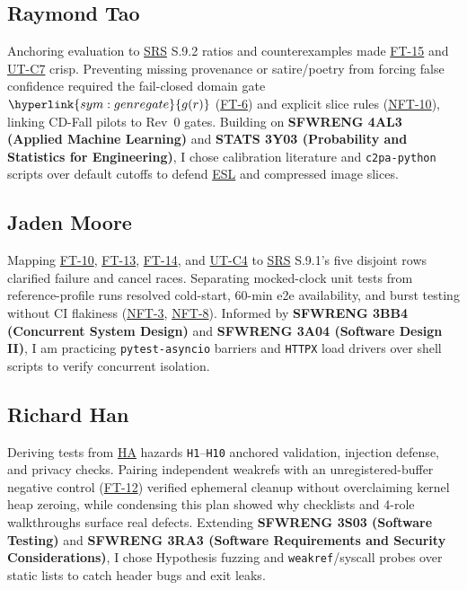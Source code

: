 \documentclass[12pt, titlepage]{article}
\newcommand{\SymGenreGate}{\hyperlink{sym:genregate}{g(r)}}
\newcommand{\ESL}{\hyperlink{vnv-acr-esl}{ESL}}
\newcommand{\HA}{\hyperlink{vnv-acr-ha}{HA}}
\newcommand{\SRS}{\hyperlink{vnv-acr-srs}{SRS}}
\begin{document}
\subsection*{Raymond Tao}
Anchoring evaluation to \SRS{} S.9.2 ratios and counterexamples made \hyperref[test:FT-15]{FT-15} and \hyperref[ut:C7]{UT-C7} crisp. Preventing missing provenance or satire/poetry from forcing false confidence required the fail-closed domain gate $\SymGenreGate$ (\hyperref[test:FT-6]{FT-6}) and explicit slice rules (\hyperref[test:NFT-10]{NFT-10}), linking CD-Fall pilots to Rev~0 gates. Building on \textbf{SFWRENG 4AL3 (Applied Machine Learning)} and \textbf{STATS 3Y03 (Probability and Statistics for Engineering)}, I chose calibration literature and \texttt{c2pa-python} scripts over default cutoffs to defend \ESL{} and compressed image slices.

\subsection*{Jaden Moore}
Mapping \hyperref[test:FT-10]{FT-10}, \hyperref[test:FT-13]{FT-13}, \hyperref[test:FT-14]{FT-14}, and \hyperref[ut:C4]{UT-C4} to \SRS{} S.9.1's five disjoint rows clarified failure and cancel races. Separating mocked-clock unit tests from reference-profile runs resolved cold-start, 60-min e2e availability, and burst testing without CI flakiness (\hyperref[test:NFT-3]{NFT-3}, \hyperref[test:NFT-8]{NFT-8}). Informed by \textbf{SFWRENG 3BB4 (Concurrent System Design)} and \textbf{SFWRENG 3A04 (Software Design II)}, I am practicing \texttt{pytest-asyncio} barriers and \texttt{HTTPX} load drivers over shell scripts to verify concurrent isolation.

\subsection*{Richard Han}
Deriving tests from \HA{} hazards \texttt{H1}--\texttt{H10} anchored validation, injection defense, and privacy checks. Pairing independent weakrefs with an unregistered-buffer negative control (\hyperref[test:FT-12]{FT-12}) verified ephemeral cleanup without overclaiming kernel heap zeroing, while condensing this plan showed why checklists and 4-role walkthroughs surface real defects. Extending \textbf{SFWRENG 3S03 (Software Testing)} and \textbf{SFWRENG 3RA3 (Software Requirements and Security Considerations)}, I chose Hypothesis fuzzing and \texttt{weakref}/syscall probes over static lists to catch header bugs and exit leaks.
\end{document}
